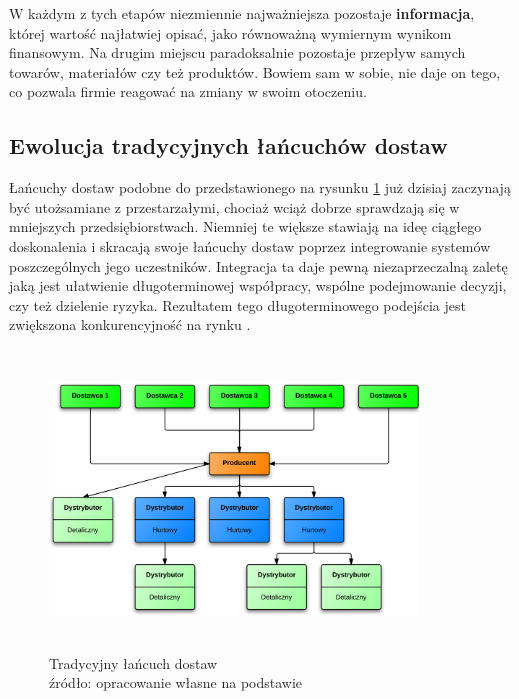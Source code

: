 	W każdym z tych etapów niezmiennie najważniejsza 
	pozostaje \textbf{informacja}, której wartość najłatwiej
	opisać, jako równoważną wymiernym wynikom finansowym. 
	Na drugim miejscu paradoksalnie pozostaje przepływ
	samych towarów, materiałów czy też produktów. 
	Bowiem sam w sobie, nie daje on tego, co pozwala
	firmie reagować na zmiany w swoim otoczeniu.
	
	\subsection{Ewolucja tradycyjnych łańcuchów dostaw}
		\hspace{15pt}Łańcuchy dostaw podobne do przedstawionego na rysunku \ref{fig:simple_supply_chain} już dzisiaj 
		zaczynają być utożsamiane z przestarzałymi, chociaż
		wciąż dobrze sprawdzają się w mniejszych przedsiębiorstwach. 
		Niemniej te większe stawiają na ideę ciągłego doskonalenia
		i skracają swoje łańcuchy dostaw poprzez integrowanie 
		systemów poszczególnych jego uczestników.
		Integracja ta daje pewną niezaprzeczalną zaletę jaką jest ułatwienie 
		długoterminowej współpracy, wspólne podejmowanie decyzji, czy też
		dzielenie ryzyka. Rezultatem tego długoterminowego
		podejścia jest zwiększona konkurencyjność na rynku \cite{zarzadzanie_lancuchem_dostaw_w_dobie_gospodarki_elektroniczej}.\\
		
		\begin{figure}[h]
			\centering
			\includegraphics[width=370px, height=300px]{images/BasicSupplyChain}
			\caption[Schemat budowy prostego łańcucha dostaw]{
				Tradycyjny łańcuch dostaw \\
				źródło: opracowanie własne na podstawie \cite{zarzadzanie_lancuchem_dostaw_w_dobie_gospodarki_elektroniczej}
			}
			\label{fig:simple_supply_chain}
		\end{figure}		
		
